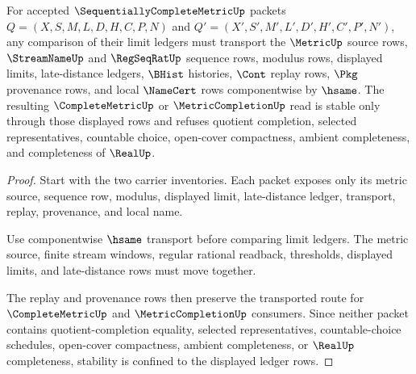 \begin{theorem}
\label{thm:sequentially-complete-metric-limit-ledger-stability}
For accepted $\SequentiallyCompleteMetricUp$ packets $Q=(X,S,M,L,D,H,C,P,N)$ and $Q'=(X',S',M',L',D',H',C',P',N')$, any comparison of their limit ledgers must transport the $\MetricUp$ source rows, $\StreamNameUp$ and $\RegSeqRatUp$ sequence rows, modulus rows, displayed limits, late-distance ledgers, $\BHist$ histories, $\Cont$ replay rows, $\Pkg$ provenance rows, and local $\NameCert$ rows componentwise by $\hsame$. The resulting $\CompleteMetricUp$ or $\MetricCompletionUp$ read is stable only through those displayed rows and refuses quotient completion, selected representatives, countable choice, open-cover compactness, ambient completeness, and completeness of $\RealUp$.
\end{theorem}
\begin{proof}
Start with the two carrier inventories. Each packet exposes only its metric source, sequence row, modulus, displayed limit, late-distance ledger, transport, replay, provenance, and local name.

Use componentwise $\hsame$ transport before comparing limit ledgers. The metric source, finite stream windows, regular rational readback, thresholds, displayed limits, and late-distance rows must move together.

The replay and provenance rows then preserve the transported route for $\CompleteMetricUp$ and $\MetricCompletionUp$ consumers. Since neither packet contains quotient-completion equality, selected representatives, countable-choice schedules, open-cover compactness, ambient completeness, or $\RealUp$ completeness, stability is confined to the displayed ledger rows.
\end{proof}

